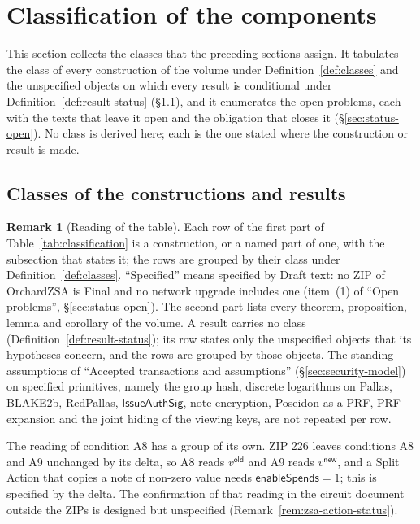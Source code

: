\documentclass[11pt,a4paper]{article}
\theoremstyle{definition}
\newtheorem{remark}[theorem]{Remark}
\begin{document}
\section{Classification of the components}\label{sec:status}

This section collects the classes that the preceding sections assign. It
tabulates the class of every construction of the volume under
Definition~\ref{def:classes} and the unspecified objects on which every
result is conditional under Definition~\ref{def:result-status}
(\S\ref{sec:status-classes}), and it enumerates the open problems, each
with the texts that leave it open and the obligation that closes it
(\S\ref{sec:status-open}). No class is derived here; each is the one stated
where the construction or result is made.

\subsection{Classes of the constructions and results}
\label{sec:status-classes}

\begin{remark}[Reading of the table]
Each row of the first part of Table~\ref{tab:classification} is a
construction, or a named part of one, with the subsection that states it;
the rows are grouped by their class under Definition~\ref{def:classes}.
``Specified'' means specified by Draft text: no ZIP of OrchardZSA is Final
and no network upgrade includes one (item~(1) of ``Open problems'',
\S\ref{sec:status-open}). The second part lists every theorem, proposition,
lemma and corollary of the volume. A result carries no class
(Definition~\ref{def:result-status}); its row states only the unspecified
objects that its hypotheses concern, and the rows are grouped by those
objects. The standing assumptions of ``Accepted transactions and
assumptions'' (\S\ref{sec:security-model}) on specified primitives, namely
the group hash, discrete logarithms on Pallas, BLAKE2b, RedPallas,
$\mathsf{IssueAuthSig}$, note encryption, Poseidon as a PRF, PRF expansion
and the joint hiding of the viewing keys, are not repeated per row.
\end{remark}

The reading of condition A8 has a group of its own. ZIP 226 leaves
conditions A8 and A9 unchanged by its delta, so A8 reads $v^{\mathsf{old}}$
and A9 reads $v^{\mathsf{new}}$, and a Split Action that copies a note of
non-zero value needs $\mathsf{enableSpends} = 1$; this is specified by the
delta. The confirmation of that reading in the circuit document outside the ZIPs
is designed but unspecified (Remark~\ref{rem:zsa-action-status}).
\end{document}
